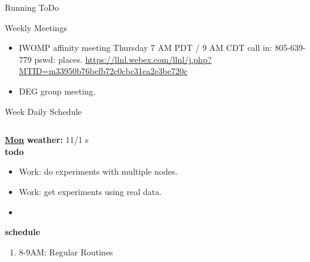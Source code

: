 \begin{columns}
\begin{column}{0.6\linewidth}
\begin{block}{Running ToDo}
\begin{enumerate}
    \end{enumerate}
  \end{block}
  
  \begin{block}{Weekly Meetings}
    \begin{itemize}
      \tiny \item \tiny IWOMP affinity meeting Thursday 7 AM PDT / 9 AM
      CDT call in: 805-639-779 pswd: places. \url{https://llnl.webex.com/llnl/j.php?MTID=m33950b76befb72c0cbc31ea2e3be720c}
    \item \tiny DEG group meeting.          \end{itemize}
  \end{block} 
      \begin{block}{Week Daily Schedule}
        \begin{columns}
          \begin{column}{0.14\textwidth}{\small \underline{\bf Mon}}
            {\tiny \bf {\tiny weather:} } {\tiny 11/1 s} \\ 
            {\tiny \bf {\tiny todo}}\\ 
            \begin{itemize}
              \tiny \item \tiny Work: do experiments with multiple nodes. 
            \item \tiny Work: get experiments using real data.  
            \item \tiny 
            \end{itemize}
                {\small  \bf schedule}\\
                \begin{enumerate} 
                  \tiny \item \tiny 8-9AM: Regular Routines 
                \end{enumerate}
          \end{column}


\end{columns}
\end{block}
\end{column}
\end{columns}
